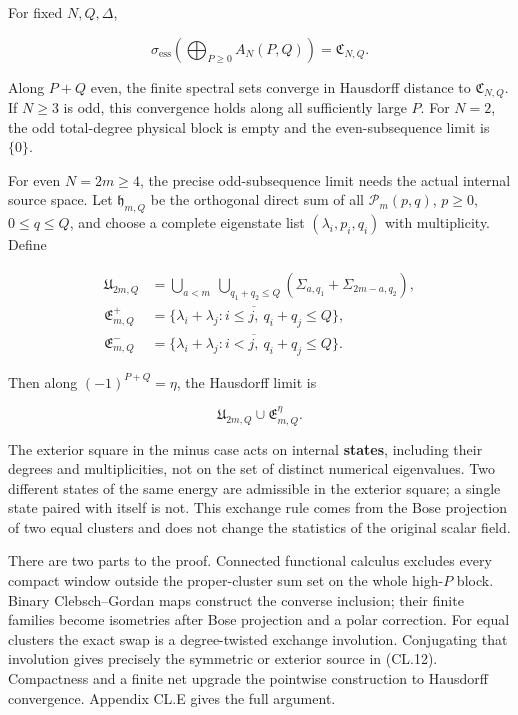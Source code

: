 \documentclass[a4paper,11pt]{article}
\numberwithin{equation}{section}
\begin{document}
For fixed \(N,Q,\Delta\),

\[
\sigma_{\mathrm{ess}}\!\left(\bigoplus_{P\geq0}A_N(P,Q)\right)
=\mathfrak C_{N,Q}.
\tag{CL.11}
\]

Along \(P+Q\) even, the finite spectral sets converge in Hausdorff distance to \(\mathfrak C_{N,Q}\). If \(N\geq3\) is odd, this convergence holds along all sufficiently large \(P\). For \(N=2\), the odd total-degree physical block is empty and the even-subsequence limit is \(\{0\}\).

For even \(N=2m\geq4\), the precise odd-subsequence limit needs the actual internal source space. Let \(\mathfrak h_{m,Q}\) be the orthogonal direct sum of all \(\mathcal P_m(p,q)\), \(p\geq0\), \(0\leq q\leq Q\), and choose a complete eigenstate list \((\lambda_i,p_i,q_i)\) with multiplicity. Define

\[
\begin{aligned}
\mathfrak U_{2m,Q}
 &=\bigcup_{a<m}\ \bigcup_{q_1+q_2\leq Q}
 (\Sigma_{a,q_1}+\Sigma_{2m-a,q_2}),\\
\mathfrak E_{m,Q}^{+}
 &=\overline{\{\lambda_i+\lambda_j:i\leq j,\ q_i+q_j\leq Q\}},\\
\mathfrak E_{m,Q}^{-}
 &=\overline{\{\lambda_i+\lambda_j:i<j,\ q_i+q_j\leq Q\}}.
\end{aligned}
\tag{CL.12}
\]

Then along \((-1)^{P+Q}=\eta\), the Hausdorff limit is

\[
\mathfrak U_{2m,Q}\cup\mathfrak E_{m,Q}^{\eta}.
\tag{CL.13}
\]

The exterior square in the minus case acts on internal \textbf{states}, including their degrees and multiplicities, not on the set of distinct numerical eigenvalues. Two different states of the same energy are admissible in the exterior square; a single state paired with itself is not. This exchange rule comes from the Bose projection of two equal clusters and does not change the statistics of the original scalar field.

There are two parts to the proof. Connected functional calculus excludes every compact window outside the proper-cluster sum set on the whole high-\(P\) block. Binary Clebsch--Gordan maps construct the converse inclusion; their finite families become isometries after Bose projection and a polar correction. For equal clusters the exact swap is a degree-twisted exchange involution. Conjugating that involution gives precisely the symmetric or exterior source in (CL.12). Compactness and a finite net upgrade the pointwise construction to Hausdorff convergence. Appendix CL.E gives the full argument.
\end{document}
